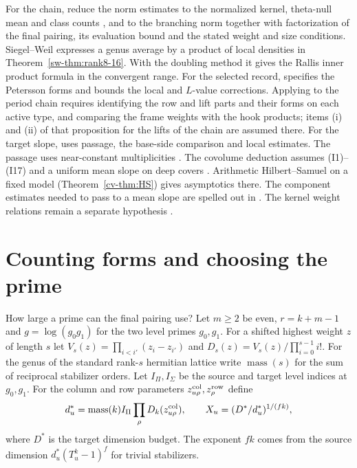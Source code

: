 \documentclass[reqno]{amsart}
\theoremstyle{definition}
\theoremstyle{plain}
\newcommand{\mass}{\operatorname{mass}}
\begin{document}
For the chain, \cite[Thms.~15.46 and~15.51]{Adr} reduce the norm estimates to
the normalized kernel, theta-null mean and class counts
\cite[Hyps.~15.42--15.44]{Adr}, and to the branching norm
\cite[Hyp.~15.50]{Adr} together with factorization of the final pairing, its evaluation bound
and the stated weight and size conditions.
Siegel--Weil expresses a genus average by a product of local densities
in Theorem~\ref{sw-thm:rank8-16}.  With the doubling method it gives the
Rallis inner product formula in the convergent range.  For the selected record,
\cite[\S15.13]{Adr} specifies the Petersson forms and bounds the local and
$L$-value corrections.  Applying \cite[Prop.~15.52]{Adr} to the period chain
requires identifying the row and lift parts and their forms on each active
type, and comparing the frame weights with the hook products; items (i)
and (ii) of that proposition for the lifts of the chain are assumed there.
For the target slope, \cite[Thm.~15.70]{Adr} uses passage, the base-side
comparison and local estimates.  The passage uses near-constant
multiplicities \cite[Hyp.~15.56]{Adr}.  The covolume deduction
\cite[Thm.~15.66]{Adr} assumes (I1)--(I17) and a uniform mean slope
on deep covers \cite[Hyp.~15.69]{Adr}.  Arithmetic Hilbert--Samuel
on a fixed model (Theorem~\ref{cv-thm:HS}) gives asymptotics there.
The component estimates needed to pass to a mean slope are spelled out in
\cite[Lemma~15.62]{Adr}.  The kernel weight relations remain a separate
hypothesis \cite[Hyp.~15.18]{Adr}.

\section{Counting forms and choosing the prime}\label{sec:prime}

How large a prime can the final pairing use?  Let $m\ge2$ be even,
$r=k+m-1$ and $g=\log(g_0g_1)$ for the two level primes $g_0,g_1$.
For a shifted highest weight $z$ of length $s$ let
$V_s(z)=\prod_{i<i'}(z_i-z_{i'})$ and $D_s(z)=V_s(z)/\prod_{i=0}^{s-1}i!$.
For the genus of the standard rank-$s$ hermitian lattice write $\mass(s)$
for the sum of reciprocal stabilizer orders.  Let $I_\Pi,I_\Sigma$ be the
source and target level indices at $g_0,g_1$.  For the column and row
parameters $z^{\rm col}_{u\rho},z^{\rm row}_\rho$ define
\[
 d_u^*=\mass(k) I_\Pi\prod_{\rho}D_k(z^{\rm col}_{u\rho}),
 \qquad X_u=(D^*/d_u^*)^{1/(fk)},
\]
where $D^*$ is the target dimension budget.  The exponent $fk$ comes from
the source dimension $d_u^*(T_u^k-1)^f$ for trivial stabilizers.
\end{document}
